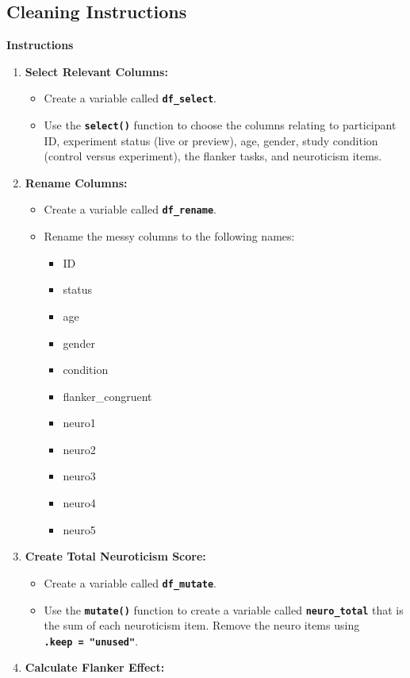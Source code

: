 \documentclass[
]{book}
\begin{document}
\hypertarget{cleaning-instructions}{%
\subsection{Cleaning Instructions}\label{cleaning-instructions}}

\textbf{Instructions}

\begin{enumerate}
\def\labelenumi{\arabic{enumi}.}
\item
  \textbf{Select Relevant Columns:}

  \begin{itemize}
  \item
    Create a variable called \textbf{\texttt{df\_select}}.
  \item
    Use the \textbf{\texttt{select()}} function to choose the columns relating to participant ID, experiment status (live or preview), age, gender, study condition (control versus experiment), the flanker tasks, and neuroticism items.
  \end{itemize}
\item
  \textbf{Rename Columns:}

  \begin{itemize}
  \item
    Create a variable called \textbf{\texttt{df\_rename}}.
  \item
    Rename the messy columns to the following names:

    \begin{itemize}
    \item
      ID
    \item
      status
    \item
      age
    \item
      gender
    \item
      condition
    \item
      flanker\_congruent
    \item
      neuro1
    \item
      neuro2
    \item
      neuro3
    \item
      neuro4
    \item
      neuro5
    \end{itemize}
  \end{itemize}
\item
  \textbf{Create Total Neuroticism Score:}

  \begin{itemize}
  \item
    Create a variable called \textbf{\texttt{df\_mutate}}.
  \item
    Use the \textbf{\texttt{mutate()}} function to create a variable called \textbf{\texttt{neuro\_total}} that is the sum of each neuroticism item. Remove the neuro items using \textbf{\texttt{.keep\ =\ "unused"}}.
  \end{itemize}
\item
  \textbf{Calculate Flanker Effect:}


\end{enumerate}
\end{document}
